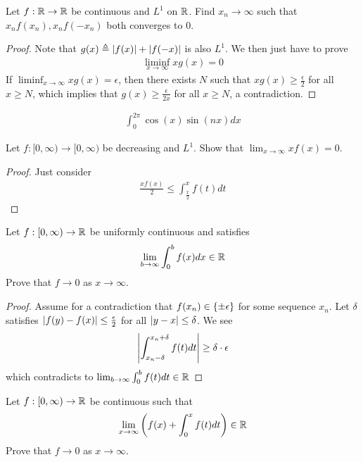 \documentclass{report}
\begin{document}
\begin{question}{}{}
Let $f:\mathbb{R}\rightarrow \mathbb{R}$ be continuous and $L^1$ on  $\mathbb{R}$. Find  $x_n \rightarrow \infty$ such that $x_nf(x_n),x_nf(-x_n)$ both converges to $0$. 
\end{question}
\begin{proof}
Note that $g(x)\triangleq \left|f(x)\right|+ \left|f(-x)\right|$ is also $L^1$. We then just have to prove 
\begin{align*}
  \liminf_{x\to\infty} xg(x)=0
\end{align*}
If $\liminf_{x\to\infty} xg(x)=\epsilon $, then there exists $N$ such that $xg(x)\geq \frac{\epsilon}{2}$ for all $x\geq N$, which implies that $g(x)\geq \frac{\epsilon }{2x}$ for all $x\geq N$, a contradiction.  
\end{proof}
\begin{align*}
\int_0^{2 \pi  } \cos (x) \sin (nx) dx  
\end{align*}
\begin{question}{}{}
Let $f:[0,\infty)\rightarrow [0,\infty)$ be decreasing and $L^1$. Show that  $\lim_{x\to \infty}xf(x)=0$. 
\end{question}
\begin{proof}
Just consider 
\begin{align*}
\frac{xf(x)}{2}\leq \int_{\frac{x}{2}}^x f(t)dt
\end{align*}
\end{proof}
\begin{question}{}{}
Let $f:[0,\infty) \rightarrow \mathbb{R}$ be uniformly continuous and satisfies 
\begin{align*}
\lim_{b\to \infty} \int_0^b f(x)dx \in\mathbb{R}
\end{align*}
Prove that  $f\rightarrow 0$ as $x \rightarrow  \infty$.  
\end{question}
\begin{proof}
Assume for a contradiction that $f(x_n) \in \left\{ \pm \epsilon  \right\}$ for some sequence $x_n $. Let $\delta$ satisfies $\left|f(y)-f(x)\right|\leq \frac{\epsilon}{2}$ for all $\left|y-x\right|\leq \delta$.  We see 
\begin{align*}
  \left|\int_{x_n-\delta}^{x_n+\delta} f(t)dt \right|\geq \delta \cdot \epsilon 
\end{align*}
which contradicts to $\lim_{b\to \infty}\int_0^b f(t)dt\in\mathbb{R} $
\end{proof}
\begin{question}{}{}
Let $f:[0,\infty)\rightarrow \mathbb{R}$ be continuous such that 
\begin{align*}
\lim_{x\to \infty} \left(f(x)+ \int_0^x f(t)dt \right) \in\mathbb{R}
\end{align*}
Prove that $f\rightarrow 0$ as $x\rightarrow  \infty$. 
\end{question}
\end{document}
